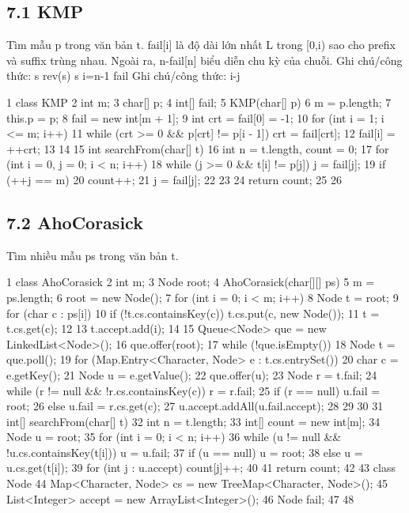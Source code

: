 \documentclass[11pt]{article}
\begin{document}
\subsection{7.1 KMP}
\begin{NoteBlock}
Tìm mẫu p trong văn bản t.
fail[i] là độ dài lớn nhất L trong [0,i) sao cho prefix và suffix trùng nhau.
Ngoài ra, n-fail[n] biểu diễn chu kỳ của chuỗi.
Ghi chú/công thức: s  rev(s)   s  i=n-1   fail
Ghi chú/công thức: i-j
\end{NoteBlock}
\begin{Code}
1 class KMP {
2 int m;
3 char[] p;
4 int[] fail;
5 KMP(char[] p) {
6 m = p.length;
7 this.p = p;
8 fail = new int[m + 1];
9 int crt = fail[0] = -1;
10 for (int i = 1; i <= m; i++) {
11 while (crt >= 0 && p[crt] != p[i - 1]) crt = fail[crt];
12 fail[i] = ++crt;
13 }
14 }
15 int searchFrom(char[] t) {
16 int n = t.length, count = 0;
17 for (int i = 0, j = 0; i < n; i++) {
18 while (j >= 0 && t[i] != p[j]) j = fail[j];
19 if (++j == m) {
20 count++;
21 j = fail[j];
22 }
23 }
24 return count;
25 }
26 }
\end{Code}
\subsection{7.2 AhoCorasick}
\begin{NoteBlock}
Tìm nhiều mẫu ps trong văn bản t.
\end{NoteBlock}
\begin{Code}
1 class AhoCorasick {
2 int m;
3 Node root;
4 AhoCorasick(char[][] ps) {
5 m = ps.length;
6 root = new Node();
7 for (int i = 0; i < m; i++) {
8 Node t = root;
9 for (char c : ps[i]) {
10 if (!t.cs.containsKey(c)) t.cs.put(c, new Node());
11 t = t.cs.get(c);
12 }
13 t.accept.add(i);
14 }
15 Queue<Node> que = new LinkedList<Node>();
16 que.offer(root);
17 while (!que.isEmpty()) {
18 Node t = que.poll();
19 for (Map.Entry<Character, Node> e : t.cs.entrySet()) {
20 char c = e.getKey();
21 Node u = e.getValue();
22 que.offer(u);
23 Node r = t.fail;
24 while (r != null && !r.cs.containsKey(c)) r = r.fail;
25 if (r == null) u.fail = root;
26 else u.fail = r.cs.get(c);
27 u.accept.addAll(u.fail.accept);
28 }
29 }
30 }
31 int[] searchFrom(char[] t) {
32 int n = t.length;
33 int[] count = new int[m];
34 Node u = root;
35 for (int i = 0; i < n; i++) {
36 while (u != null && !u.cs.containsKey(t[i])) u = u.fail;
37 if (u == null) u = root;
38 else u = u.cs.get(t[i]);
39 for (int j : u.accept) count[j]++;
40 }
41 return count;
42 }
43 class Node {
44 Map<Character, Node> cs = new TreeMap<Character, Node>();
45 List<Integer> accept = new ArrayList<Integer>();
46 Node fail;
47 }
48 }
\end{Code}
\end{document}
